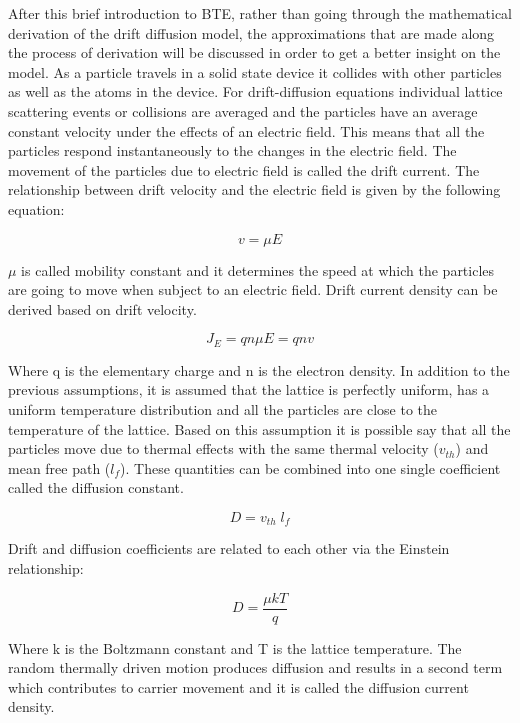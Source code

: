 \begin{doublespace}
After this brief introduction to BTE, rather than going through the mathematical derivation of the drift diffusion model, the approximations that are made along the process of derivation will be discussed in order to get a better insight on the model.  As a particle travels in a solid state device it collides with other particles as well as the atoms in the device. For drift-diffusion equations individual lattice scattering events or collisions are averaged and the particles have an average constant velocity under the effects of an electric field. This means that all the particles respond instantaneously to the changes in the electric field. The movement of the particles due to electric field is called the drift current. The relationship between drift velocity and the electric field is given by the following equation:

\begin{equation}
v=\mu E
\end{equation}

$\mu$ is called mobility constant and it determines the speed at which the particles are going to move when subject to an electric field. Drift current density can be derived based on drift velocity.

\begin{equation}
J_E=q n\mu E=q n v 
\end{equation}

Where q is the elementary charge and n is the electron density. In addition to the previous assumptions, it is assumed that the lattice is perfectly uniform, has a uniform temperature distribution and all the particles are close to the temperature of the lattice. Based on this assumption it is possible say that all the particles move due to thermal effects with the same thermal velocity ($v_{th}$) and mean free path ($l_f$). These quantities can be combined into one single coefficient called the diffusion constant. 

\begin{equation}
D=v_{th} \;l_f
\end{equation}

Drift and diffusion coefficients are related to each other via the Einstein relationship:

\begin{equation}
D=\frac{\mu k T}{q}
\end{equation}

Where k is the Boltzmann constant and T is the lattice temperature. The random thermally driven motion produces diffusion and results in a second term which contributes to carrier movement and it is called the diffusion current density.


\end{doublespace}
